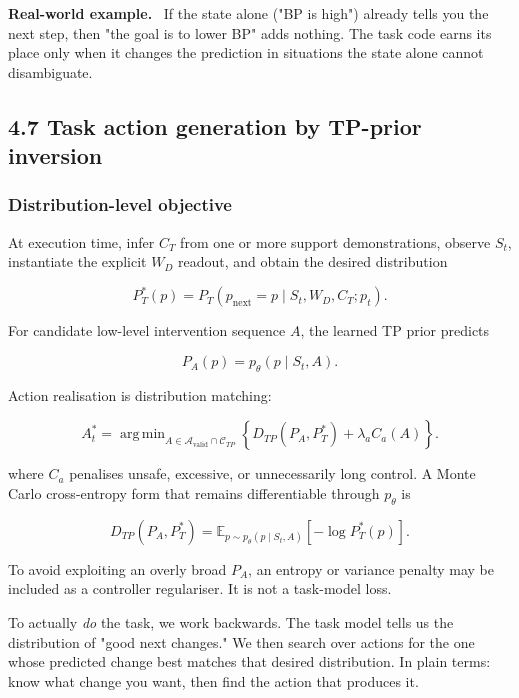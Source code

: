 \documentclass[11pt]{article}
\DeclareMathOperator*{\argmin}{arg\,min}
\newenvironment{plainword}{%
  \par\medskip\noindent\begin{minipage}{\textwidth}%
  \color{gray!75!black}\small\itshape
}{%
  \end{minipage}\par\medskip}
\newenvironment{example}{%
  \par\smallskip\noindent\begin{minipage}{\textwidth}%
  \color{teal!60!black}\small
  \textbf{\color{teal!70!black}Real-world example.}\
}{%
  \end{minipage}\par\smallskip}
\begin{document}
\begin{example}
If the state alone ("BP is high") already tells you the next step, then "the goal is to lower BP" adds nothing. The task code earns
its place only when it changes the prediction in situations the state alone cannot disambiguate.
\end{example}

\subsection*{4.7 Task action generation by TP-prior inversion}

\subsubsection*{Distribution-level objective}

At execution time, infer $C_T$ from one or more support demonstrations, observe $S_t$, instantiate the explicit $W_D$ readout, and
obtain the desired distribution

\[
P_T^*(p)=P_T(p_{\mathrm{next}}=p\mid S_t,W_D,C_T;p_t).
\]

For candidate low-level intervention sequence $A$, the learned TP prior predicts

\[
P_A(p)=p_\theta(p\mid S_t,A).
\]

Action realisation is distribution matching:

\[
\boxed{
A_t^*=\argmin_{A\in\mathcal A_{\mathrm{valid}}\cap\mathcal C_{TP}}
\left\{
D_{TP}(P_A,P_T^*)+\lambda_aC_a(A)
\right\}.}
\]

where $C_a$ penalises unsafe, excessive, or unnecessarily long control. A Monte Carlo cross-entropy form that remains differentiable
through $p_\theta$ is

\[
\boxed{
D_{TP}(P_A,P_T^*)=
\mathbb E_{p\sim p_\theta(p\mid S_t,A)}[-\log P_T^*(p)].}
\]

To avoid exploiting an overly broad $P_A$, an entropy or variance penalty may be included as a controller regulariser. It is not a
task-model loss.

\begin{plainword}
To actually \emph{do} the task, we work backwards. The task model tells us the distribution of "good next changes." We then search
over actions for the one whose predicted change best matches that desired distribution. In plain terms: know what change you want,
then find the action that produces it.
\end{plainword}
\end{document}
